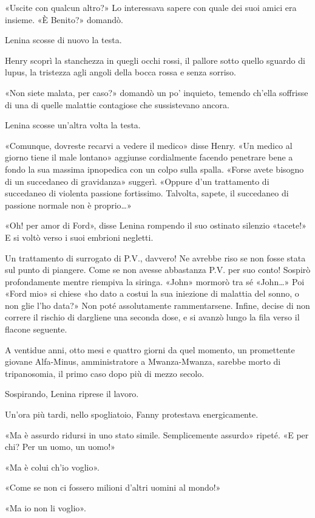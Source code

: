 \documentclass[
a5paper, %
10pt, %
twoside, 
onecolumn, %
openany, %
]{memoir}
\begin{document}
«Uscite con qualcun altro?» Lo interessava sapere con quale dei suoi amici era insieme. «È Benito?» domandò.

Lenina scosse di nuovo la testa.

Henry scoprì la stanchezza in quegli occhi rossi, il pallore sotto quello sguardo di lupus, la tristezza agli angoli della bocca rossa e senza sorriso.

«Non siete malata, per caso?» domandò un po’ inquieto, temendo ch’ella soffrisse di una di quelle malattie contagiose che sussistevano ancora.

Lenina scosse un’altra volta la testa.

«Comunque, dovreste recarvi a vedere il medico» disse Henry. «Un medico al giorno tiene il male lontano» aggiunse cordialmente facendo penetrare bene a fondo la sua massima ipnopedica con un colpo sulla spalla. «Forse avete bisogno di un succedaneo di gravidanza» suggerì. «Oppure d’un trattamento di succedaneo di violenta passione fortissimo. Talvolta, sapete, il succedaneo di passione normale non è proprio…»

«Oh! per amor di Ford», disse Lenina rompendo il suo ostinato silenzio «tacete!» E si voltò verso i suoi embrioni negletti.

Un trattamento di surrogato di P.V., davvero! Ne avrebbe riso se non fosse stata sul punto di piangere. Come se non avesse abbastanza P.V. per suo conto! Sospirò profondamente mentre riempiva la siringa. «John» mormorò tra sé «John…» Poi «Ford mio» si chiese «ho dato a costui la sua iniezione di malattia del sonno, o non glie l’ho data?» Non poté assolutamente rammentarsene. Infine, decise di non correre il rischio di dargliene una seconda dose, e si avanzò lungo la fila verso il flacone seguente.

A ventidue anni, otto mesi e quattro giorni da quel momento, un promettente giovane Alfa-Minus, amministratore a Mwanza-Mwanza, sarebbe morto di tripanosomia, il primo caso dopo più di mezzo secolo.

Sospirando, Lenina riprese il lavoro.

Un’ora più tardi, nello spogliatoio, Fanny protestava energicamente.

«Ma è assurdo ridursi in uno stato simile. Semplicemente assurdo» ripeté. «E per chi? Per un uomo, un uomo!»

«Ma è colui ch’io voglio».

«Come se non ci fossero milioni d’altri uomini al mondo!»

«Ma io non li voglio».
\end{document}
